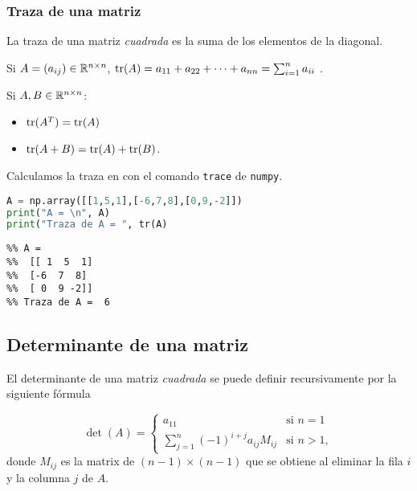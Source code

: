 \subsubsection{Traza de una matriz}

La traza de una matriz \emph{cuadrada} es la suma de los elementos de la diagonal.

Si $\Ab = (a_{ij}) \in \R^{n \times n}$, $\tr(\Ab) = a_{11} + a_{22} + \dots + a_{nn} = \sum_{i=1}^n a_{ii}$ .

\begin{prop} Si $\Ab, \Bb \in \R^{n \times n}$:
\begin{itemize}
\item $\tr(\Ab^T)=\tr(\Ab)$
\item $\tr(\Ab+\Bb) = \tr(\Ab) + \tr(\Bb)$.
\end{itemize}
\end{prop}

Calculamos la traza en \python con el comando \texttt{trace} de \texttt{numpy}.

\begin{Shaded}
\begin{lstlisting}[language=Python]
A = np.array([[1,5,1],[-6,7,8],[0,9,-2]])
print("A = \n", A)
print("Traza de A = ", tr(A)
\end{lstlisting}
\end{Shaded}

\begin{verbatim}
%% A =
%%  [[ 1  5  1]
%%  [-6  7  8]
%%  [ 0  9 -2]]
%% Traza de A =  6
\end{verbatim}

\subsection{Determinante de una matriz}

El determinante de una matriz \emph{cuadrada} se puede definir recursivamente por la siguiente fórmula

$$
\det(A)= \begin{cases}
a_{11} & \text{si } n = 1 \\
\sum _{j=1}^{n}(-1)^{i+j}a_{ij}M_{ij} & \text{si } n > 1,
\end{cases}
$$
donde $M_{ij}$ es la matrix de $(n-1) \times (n-1)$ que se obtiene al eliminar la fila $i$ y la columna $j$ de $A$.

